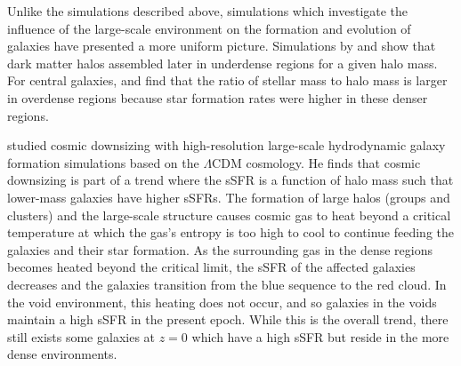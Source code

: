 Unlike the simulations described above, simulations which investigate the 
influence of the large-scale environment on the formation and evolution of 
galaxies have presented a more uniform picture.  Simulations by \cite{Jung14,
Xie14} and \cite{Tonnesen15} show that dark matter halos assembled later in 
underdense regions for a given halo mass.  For central galaxies, \cite{Jung14} 
and \cite{Tonnesen15} find that the ratio of stellar mass to halo mass is larger 
in overdense regions because star formation rates were higher in these denser 
regions.

\cite{Cen11} studied cosmic downsizing with high-resolution large-scale 
hydrodynamic galaxy formation simulations based on the $\Lambda$CDM cosmology.  
He finds that cosmic downsizing is part of a trend where the sSFR is a function 
of halo mass such that lower-mass galaxies have higher sSFRs.  The formation of 
large halos (groups and clusters) and the large-scale structure causes cosmic 
gas to heat beyond a critical temperature at which the gas's entropy is too high 
to cool to continue feeding the galaxies and their star formation.  As the 
surrounding gas in the dense regions becomes heated beyond the critical limit, 
the sSFR of the affected galaxies decreases and the galaxies transition from the 
blue sequence to the red cloud.  In the void environment, this heating does not 
occur, and so galaxies in the voids maintain a high sSFR in the present epoch.  
While this is the overall trend, there still exists some galaxies at $z=0$ which 
have a high sSFR but reside in the more dense environments.